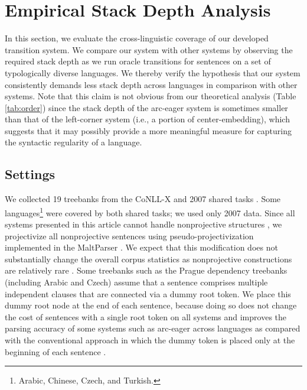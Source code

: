 \documentclass[english]{jnlp_1.4}
\begin{document}
\section{Empirical Stack Depth Analysis}
\label{sec:analysis}

In this section, we evaluate the cross-linguistic coverage of our developed transition system.
We compare our system with other systems by observing the required stack depth as we run oracle transitions for sentences on a set of typologically diverse languages.
We thereby verify the hypothesis that our system consistently demands less stack depth across languages in comparison with other systems.
Note that this claim is not obvious from our theoretical analysis (Table \ref{tab:order}) since the stack depth of the arc-eager system is sometimes smaller than that of the left-corner system (i.e., a portion of center-embedding), which suggests that it may possibly provide a more meaningful measure for capturing the syntactic regularity of a language.


\subsection{Settings}
\label{sec:analysis:settings}

We collected 19 treebanks from the CoNLL-X and 2007 shared tasks \cite{buchholz-marsi:2006:CoNLL-X,nivre-EtAl:2007:EMNLP-CoNLL2007}.
Some languages\footnote{Arabic, Chinese, Czech, and Turkish.} were covered by both shared tasks;
we used only 2007 data.
Since all systems presented in this article cannot handle nonprojective structures \cite{Nivre:2008}, we projectivize all nonprojective sentences using pseudo-projectivization \cite{nivre-nilsson:2005:ACL} implemented in the MaltParser \cite{NivreMAL07}.
We expect that this modification does not substantially change the overall corpus statistics as nonprojective constructions are relatively rare \cite{nivre-EtAl:2007:EMNLP-CoNLL2007}.
Some treebanks such as the Prague dependency treebanks (including Arabic and Czech) assume that a sentence comprises multiple independent clauses that are connected via a dummy root token.
We place this dummy root node at the end of each sentence, because doing so does not change the cost of sentences with a single root token on all systems and improves the parsing accuracy of some systems such as arc-eager across languages as compared with the conventional approach in which the dummy token is placed only at the beginning of each sentence \cite{journals/coling/BallesterosN13}.
\end{document}
